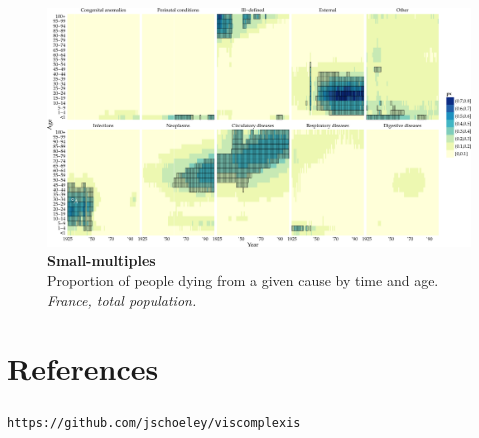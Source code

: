 \documentclass{beamer}
\begin{document}
\begin{frame}
\frametitle{\insertsection}

\begin{figure}[htb!]
\includegraphics[width = \textwidth]{../fig/plot-small_multiples.pdf}\\
\scriptsize \textbf{Small-multiples}\\ Proportion of people dying from a given cause by time and age. \tiny\emph{France, total population.}
\end{figure}

\end{frame}

\section{References} %

\begin{frame}
\frametitle{\insertsection}

\begin{centering}

\Large{}

\smallskip

\Large\texttt{https://github.com/jschoeley/viscomplexis}

\end{centering}

\end{frame}

%

\begin{frame}
\frametitle{\insertsection}

\nocite{MOLAST2000}

\printbibliography

\end{frame}
\end{document}
